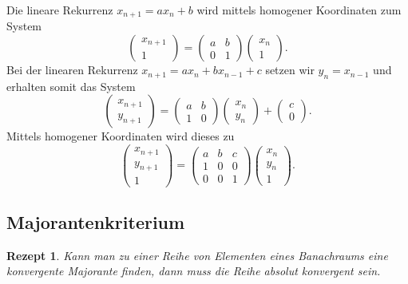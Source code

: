 \documentclass[a4paper,10pt,fleqn,twocolumn,twoside,dvipdfmx]{scrartcl}
\theoremstyle{rmbox}
\newtheorem{Rezept}{Rezept}[section]
\begin{document}
\noindent
Die lineare Rekurrenz $x_{n+1}=ax_n+b$ wird 
mittels homogener Koordinaten zum System%
\[\begin{pmatrix}
x_{n+1}\\ 1
\end{pmatrix}
= \begin{pmatrix}a & b\\ 0 & 1\end{pmatrix}
\begin{pmatrix}
x_n\\ 1
\end{pmatrix}.\]
Bei der linearen Rekurrenz $x_{n+1}=ax_n+bx_{n-1}+c$ setzen wir
$y_n = x_{n-1}$ und erhalten somit das System
\[\begin{pmatrix}
x_{n+1}\\ y_{n+1}
\end{pmatrix} = \begin{pmatrix}
a & b\\ 1 & 0
\end{pmatrix}\begin{pmatrix}
x_n\\ y_n
\end{pmatrix}+\begin{pmatrix}
c\\ 0
\end{pmatrix}.\]
Mittels homogener Koordinaten wird dieses zu
\[\begin{pmatrix}
x_{n+1}\\ y_{n+1}\\ 1
\end{pmatrix} = \begin{pmatrix}
a & b & c\\
1 & 0 & 0\\
0 & 0 & 1
\end{pmatrix}\begin{pmatrix}
x_n\\ y_n\\ 1
\end{pmatrix}.\]

\subsection{Majorantenkriterium}

\begin{Rezept}
Kann man zu einer Reihe von Elementen eines Banachraums eine
konvergente Majorante finden, dann muss die Reihe absolut konvergent
sein. 
\end{Rezept}
\end{document}
